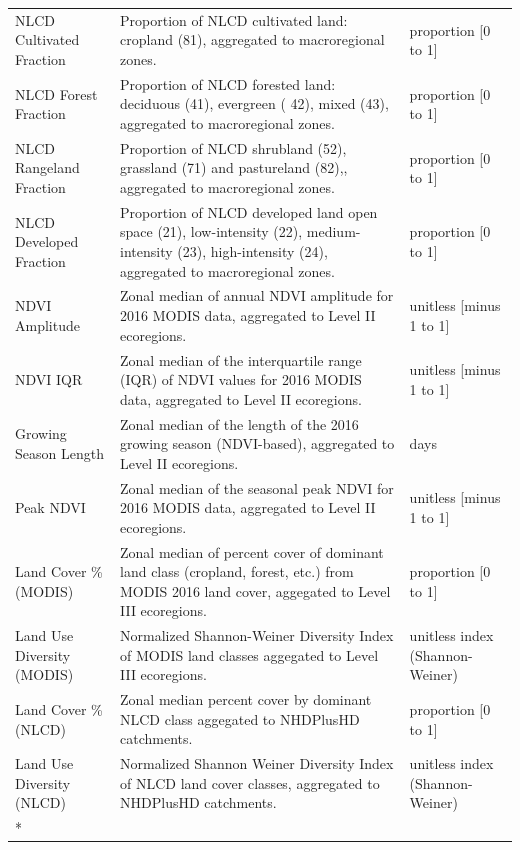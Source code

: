 \documentclass[
  10pt,
]{article}
\begin{document}
\begin{longtable}[t]{lp{8cm}l}
\endfoot
\bottomrule
\endlastfoot
NLCD Cultivated Fraction & Proportion of NLCD cultivated land: cropland (81), aggregated to
macroregional zones. & proportion [0 to 1]\\
NLCD Forest Fraction & Proportion of NLCD forested land: deciduous (41), evergreen ( 42),
mixed (43), aggregated to macroregional zones. & proportion [0 to 1]\\
NLCD Rangeland Fraction & Proportion of NLCD shrubland (52), grassland (71) and pastureland
(82),, aggregated to macroregional zones. & proportion [0 to 1]\\
NLCD Developed Fraction & Proportion of NLCD developed land open space (21), low-intensity
(22), medium-intensity (23), high-intensity (24), aggregated to
macroregional zones. & proportion [0 to 1]\\
NDVI Amplitude & Zonal median of annual NDVI amplitude for 2016 MODIS data, aggregated
to Level II ecoregions. & unitless [minus 1 to 1]\\
\addlinespace
NDVI IQR & Zonal median of the interquartile range (IQR) of NDVI values for 2016
MODIS data, aggregated to Level II ecoregions. & unitless [minus 1 to 1]\\
Growing Season Length & Zonal median of the length of the 2016 growing season (NDVI-based),
aggregated to Level II ecoregions. & days\\
Peak NDVI & Zonal median of the seasonal peak NDVI for 2016 MODIS data, aggregated
to Level II ecoregions. & unitless [minus 1 to 1]\\
Land Cover \% (MODIS) & Zonal median of percent cover of dominant land class (cropland,
forest, etc.) from MODIS 2016 land cover, aggegated to Level III
ecoregions. & proportion [0 to 1]\\
Land Use Diversity (MODIS) & Normalized Shannon-Weiner Diversity Index of MODIS land classes
aggegated to Level III ecoregions. & unitless index (Shannon-Weiner)\\
\addlinespace
Land Cover \% (NLCD) & Zonal median percent cover by dominant NLCD class aggegated to
NHDPlusHD catchments. & proportion [0 to 1]\\
Land Use Diversity (NLCD) & Normalized Shannon Weiner Diversity Index of NLCD land cover classes,
aggregated to NHDPlusHD catchments. & unitless index (Shannon-Weiner)\\*
\end{longtable}
\endgroup{}

\vspace{0.5cm}
\end{document}
